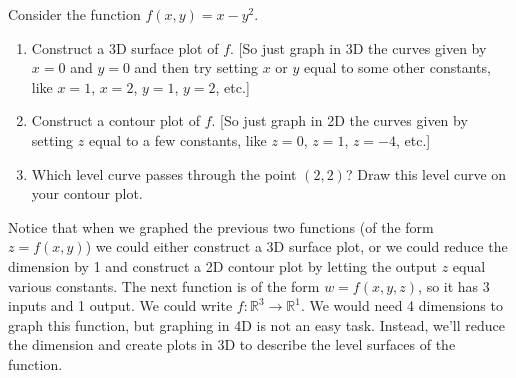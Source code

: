 \begin{problem}%

%
%
 Consider the function $f(x,y)=x-y^2$.
\begin{enumerate}
 \item Construct a 3D surface plot of $f$. [So just graph in 3D the curves given by $x=0$ and $y=0$ and then try setting $x$ or $y$ equal to some other constants, like $x=1$, $x=2$, $y=1$, $y=2$, etc.]
 \item Construct a contour plot of $f$. [So just graph in 2D the curves given by setting $z$ equal to a few constants, like $z=0$, $z=1$, $z=-4$, etc.]
 \item%
%
Which level curve passes through the point $(2,2)$?  Draw this level curve on your contour plot.
\end{enumerate}
\end{problem}

Notice that when we graphed the previous two functions (of the form $z=f(x,y)$) we could either construct a 3D surface plot, or we could reduce the dimension by 1 and construct a 2D contour plot by letting the output $z$ equal various constants. 
The next function is of the form $w=f(x,y,z)$, so it has 3 inputs and 1 output.  We could write $f\colon \mathbb{R}^3\to\mathbb{R}^1$. We would need 4 dimensions to graph this function, but graphing in 4D is not an easy task.  Instead, we'll reduce the dimension and create plots in 3D to describe the level surfaces of the function.

